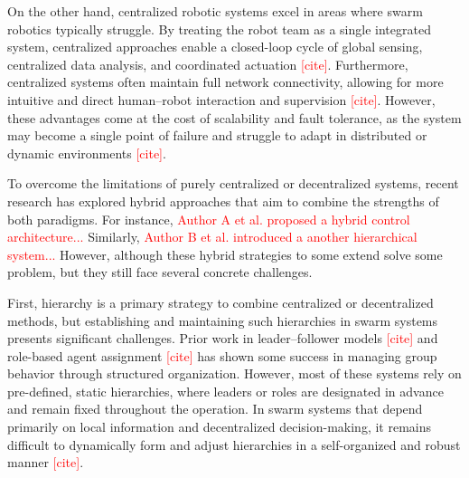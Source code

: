 On the other hand, centralized robotic systems excel in areas where swarm robotics typically struggle.
By treating the robot team as a single integrated system, centralized approaches enable a closed-loop cycle of global sensing, centralized data analysis, and coordinated actuation \textcolor{red}{[cite]}.
Furthermore, centralized systems often maintain full network connectivity, allowing for more intuitive and direct human–robot interaction and supervision \textcolor{red}{[cite]}.
However, these advantages come at the cost of scalability and fault tolerance, as the system may become a single point of failure and struggle to adapt in distributed or dynamic environments \textcolor{red}{[cite]}.

To overcome the limitations of purely centralized or decentralized systems, recent research has explored hybrid approaches that aim to combine the strengths of both paradigms.
For instance, \textcolor{red}{Author A et al. proposed a hybrid control architecture... }
Similarly, \textcolor{red}{Author B et al. introduced a another hierarchical system...}
However, although these hybrid strategies to some extend solve some problem, but they still face several concrete challenges.

First, hierarchy is a primary strategy to combine centralized or decentralized methods, but establishing and maintaining such hierarchies in swarm systems presents significant challenges.
Prior work in leader–follower models \textcolor{red}{[cite]} and role-based agent assignment \textcolor{red}{[cite]} has shown some success in managing group behavior through structured organization.
However, most of these systems rely on pre-defined, static hierarchies, where leaders or roles are designated in advance and remain fixed throughout the operation.
In swarm systems that depend primarily on local information and decentralized decision-making, it remains difficult to dynamically form and adjust hierarchies in a self-organized and robust manner \textcolor{red}{[cite]}.

